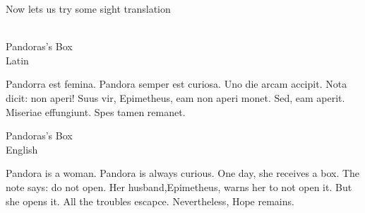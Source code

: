 Now lets us try some sight translation \\ \\ 
\begin{center}
 \huge Pandoras's Box \\
 Latin
\end{center}
Pandorra est femina. Pandora semper est curiosa. Uno die arcam accipit. 
Nota dicit: non aperi! Suus vir, Epimetheus, eam non aperi monet. Sed,  
eam aperit. Miseriae effungiunt. Spes tamen remanet. 
 \begin{center}
 \huge Pandoras's Box \\
 English
\end{center}
Pandora is a woman. Pandora is always curious. One day, she receives a box. 
The note says: do not open. Her husband,Epimetheus, warns her to not open it. 
But she opens it. All the troubles escapce. Nevertheless, Hope remains.

